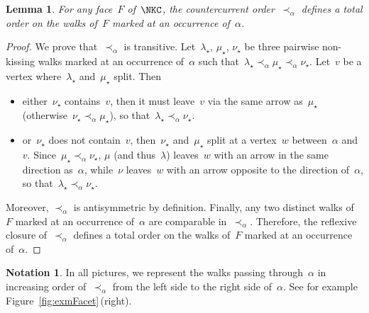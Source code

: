 \documentclass{memo-l}
\newtheorem{lemma}[theorem]{Lemma}
\theoremstyle{definition}
\newtheorem{notation}[theorem]{Notation}
\newcommand{\fref}[1]{Figure~\ref{#1}} %
\begin{document}

\begin{lemma}
For any face~$F$ of~$\NKC$, the countercurrent order~$\prec_\alpha$ defines a total order on the walks of~$F$ marked at an occurrence of~$\alpha$.
\end{lemma}

\begin{proof}
We prove that~$\prec_\alpha$ is transitive.
Let~$\lambda_\star$, $\mu_\star$, $\nu_\star$ be three pairwise non-kissing walks marked at an occurrence of~$\alpha$ such that~${\lambda_\star \prec_\alpha \mu_\star \prec_\alpha \nu_\star}$. Let~$v$ be a vertex where~$\lambda_\star$ and~$\mu_\star$ split. Then
\begin{itemize}
\item either~$\nu_\star$ contains~$v$, then it must leave~$v$ via the same arrow as~$\mu_\star$ (otherwise~$\nu_\star \prec_\alpha \mu_\star$), so that~$\lambda_\star \prec_\alpha \nu_\star$.
\item or~$\nu_\star$ does not contain~$v$, then~$\nu_\star$ and~$\mu_\star$ split at a vertex~$w$ between~$\alpha$ and~$v$. Since~${\mu_\star \prec_\alpha \nu_\star}$, $\mu$ (and thus~$\lambda$) leaves~$w$ with an arrow in the same direction as~$\alpha$, while~$\nu$ leaves~$w$ with an arrow opposite to the direction of~$\alpha$, so that~$\lambda_\star \prec_\alpha \nu_\star$.
\end{itemize}
Moreover, $\prec_\alpha$ is antisymmetric by definition.
Finally, any two distinct walks of~$F$ marked at an occurrence of~$\alpha$ are comparable in~$\prec_\alpha$.
Therefore, the reflexive closure of~$\prec_\alpha$ defines a total order on the walks of~$F$ marked at an occurrence of~$\alpha$.
\end{proof}

\begin{notation}
In all pictures, we represent the walks passing through~$\alpha$ in increasing order of~$\prec_\alpha$ from the left side to the right side of~$\alpha$. See for example \fref{fig:exmFacet}\,(right).
\end{notation}
\end{document}
